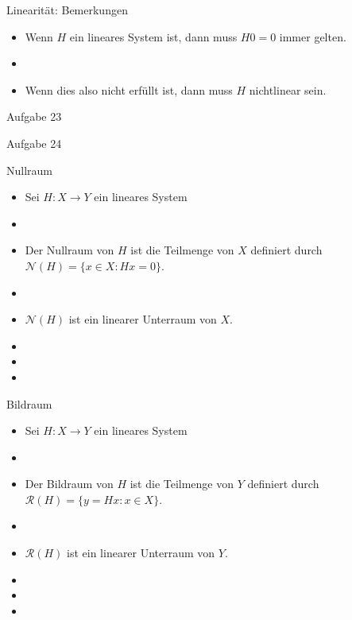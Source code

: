 \documentclass[14pt, aspectratio=169, handout]{beamer}
\begin{document}
\begin{frame}{Linearität: Bemerkungen}
    \begin{itemize}
        \item Wenn $H$ ein lineares System ist, dann muss $H0 = 0$ immer gelten.
        \item[] 
        \item Wenn dies also nicht erfüllt ist, dann muss $H$ nichtlinear sein.
    \end{itemize}
\end{frame}

\begin{frame}{Aufgabe 23}
    
\end{frame}

\begin{frame}{Aufgabe 24}
    
\end{frame}

\begin{frame}{Nullraum}
    \begin{itemize}
        \item Sei $H:X \to Y$ ein lineares System
        \item[] 
        \item[] Der Nullraum von $H$ ist die Teilmenge von $X$ definiert durch $\mathcal{N}(H) = \{x \in X : Hx = 0\}$.
        \item[] 
        \item[] $\mathcal{N}(H)$ ist ein linearer Unterraum von $X$.
        \item[] 
        \item[] 
        \item[] 
    \end{itemize}
\end{frame}

\begin{frame}{Bildraum}
    \begin{itemize}
        \item Sei $H:X \to Y$ ein lineares System
        \item[] 
        \item[] Der Bildraum von $H$ ist die Teilmenge von $Y$ definiert durch $\mathcal{R}(H) = \{y =Hx : x \in X\}$.
        \item[] 
        \item[] $\mathcal{R}(H)$ ist ein linearer Unterraum von $Y$.
        \item[] 
        \item[] 
        \item[] 
    \end{itemize}
\end{frame}
\end{document}
